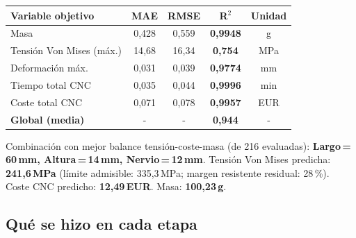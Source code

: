 \documentclass[11pt, a4paper]{article}
\begin{document}
\begin{tcolorbox}[
  colback=azulclaro, colframe=nasa, arc=4pt,
  title={\bfseries\color{white} Resultados del modelo ML (Gradient Boosting, evaluación sobre conjunto de prueba — holdout 20\,\%)},
  fonttitle=\small
]
\begin{center}
\small
\begin{tabular}{lcccc}
  \toprule
  \textbf{Variable objetivo} & \textbf{MAE} & \textbf{RMSE} & \textbf{R$^{2}$} & \textbf{Unidad}\\
  \midrule
  Masa                     & 0{,}428 & 0{,}559 & \color{verde}\textbf{0{,}9948} & g     \\
  Tensión Von Mises (máx.) & 14{,}68 & 16{,}34 & \color{naranja}\textbf{0{,}754}  & MPa   \\
  Deformación máx.         & 0{,}031 & 0{,}039 & \color{verde}\textbf{0{,}9774} & mm    \\
  Tiempo total CNC         & 0{,}035 & 0{,}044 & \color{verde}\textbf{0{,}9996} & min   \\
  Coste total CNC          & 0{,}071 & 0{,}078 & \color{verde}\textbf{0{,}9957} & EUR   \\
  \midrule
  \textbf{Global (media)}  &  {-}    &  {-}    & \color{verde}\textbf{0{,}944}  & {-}   \\
  \bottomrule
\end{tabular}
\end{center}
\end{tcolorbox}

\begin{tcolorbox}[
  colback=verdeclaro, colframe=verde, arc=4pt,
  title={\bfseries\color{white} Diseño óptimo identificado por el modelo},
  fonttitle=\small
]
\small
Combinación con mejor balance tensión-coste-masa (de 216 evaluadas):
\textbf{Largo\,=\,60\,mm, Altura\,=\,14\,mm, Nervio\,=\,12\,mm}.
Tensión Von Mises predicha: \textbf{\color{verde}241{,}6\,MPa}
(límite admisible: 335{,}3\,MPa; margen resistente residual: 28\,\%).
Coste CNC predicho: \textbf{12{,}49\,EUR}. Masa: \textbf{100{,}23\,g}.
\end{tcolorbox}

\subsection{Qué se hizo en cada etapa}
\end{document}
